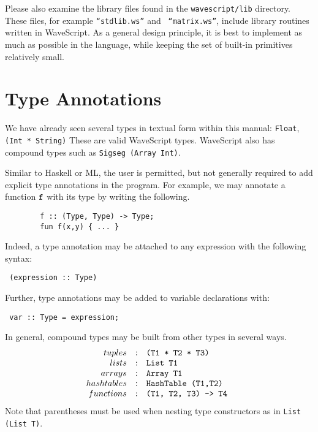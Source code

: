 \documentclass[twocolumn]{report}
\newenvironment{wscode}{\begin{center}\tt}{\end{center}}
\begin{document}
Please also examine the library files found in the {\tt wavescript/lib}
directory.  These files, for example {\tt ``stdlib.ws''} and {\tt
  ``matrix.ws''}, include library routines written in WaveScript.  As
a general design principle, it is best to implement as much as
possible in the language, while keeping the set of built-in primitives
relatively small.




\section{Type Annotations}

We have already seen several types in textual form within this manual:
{\tt Float}, {\tt (Int * String)} These are valid WaveScript types.
WaveScript also has compound types such as {\tt Sigseg (Array Int)}.

Similar to Haskell or ML, the user is permitted, but not generally
required to add explicit type annotations in the program.  For
example, we may annotate a function {$\tt f$} with its type by writing
the following.
%
\begin{verbatim}
        f :: (Type, Type) -> Type;
        fun f(x,y) { ... }
\end{verbatim}

Indeed, a type annotation may be attached to any expression with
the following syntax:
\begin{wscode}
(expression :: Type)
\end{wscode}

Further, type annotations may be added to variable declarations with:
\begin{wscode}
 var :: Type = expression;
\end{wscode}

In general, compound types may be built from other types in several
ways.  
\[
\begin{array}{rcl}
tuples           & : & $\tt (T1 * T2 * T3) $   \\
lists            & : & $\tt List T1 $ \\
arrays           & : & $\tt Array T1 $ \\
hashtables       & : & $\tt HashTable (T1,T2) $ \\
functions        & : & $\tt (T1, T2, T3) -> T4 $ \\
\end{array}
\]
Note that parentheses must be used when nesting type
constructors as in {\tt List (List T)}.
\end{document}
